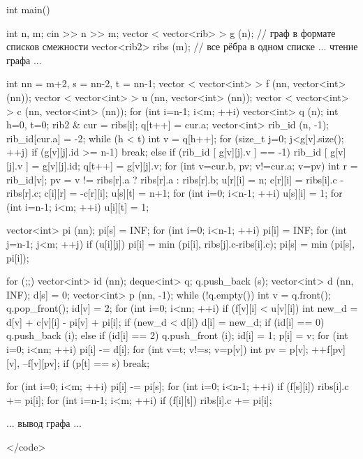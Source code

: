 int main() {

	int n, m;
	cin >> n >> m;
	vector < vector<rib> > g (n); // граф в формате списков смежности
	vector<rib2> ribs (m); // все рёбра в одном списке
	... чтение графа ...

	int nn = m+2,  s = nn-2,  t = nn-1;
	vector < vector<int> > f (nn, vector<int> (nn));
	vector < vector<int> > u (nn, vector<int> (nn));
	vector < vector<int> > c (nn, vector<int> (nn));
	for (int i=n-1; i<m; ++i) {
		vector<int> q (n);
		int h=0, t=0;
		rib2 & cur = ribs[i];
		q[t++] = cur.a;
		vector<int> rib_id (n, -1);
		rib_id[cur.a] = -2;
		while (h < t) {
			int v = q[h++];
			for (size_t j=0; j<g[v].size(); ++j)
				if (g[v][j].id >= n-1)
					break;
				else if (rib_id [ g[v][j].v ] == -1) {
					rib_id [ g[v][j].v ] = g[v][j].id;
					q[t++] = g[v][j].v;
				}
		}
		for (int v=cur.b, pv; v!=cur.a; v=pv) {
			int r = rib_id[v];
			pv = v != ribs[r].a ? ribs[r].a : ribs[r].b;
			u[r][i] = n;
			c[r][i] = ribs[i].c - ribs[r].c;
			c[i][r] = -c[r][i];
		}
	}
	u[s][t] = n+1;
	for (int i=0; i<n-1; ++i)
		u[s][i] = 1;
	for (int i=n-1; i<m; ++i)
		u[i][t] = 1;

	vector<int> pi (nn);
	pi[s] = INF;
	for (int i=0; i<n-1; ++i) {
		pi[i] = INF;
		for (int j=n-1; j<m; ++j)
			if (u[i][j])
				pi[i] = min (pi[i], ribs[j].c-ribs[i].c);
		pi[s] = min (pi[s], pi[i]);
	}

	for (;;) {
		vector<int> id (nn);
		deque<int> q;
		q.push_back (s);
		vector<int> d (nn, INF);
		d[s] = 0;
		vector<int> p (nn, -1);
		while (!q.empty()) {
			int v = q.front();  q.pop_front();
			id[v] = 2;
			for (int i=0; i<nn; ++i)
				if (f[v][i] < u[v][i]) {
					int new_d = d[v] + c[v][i] - pi[v] + pi[i];
					if (new_d < d[i]) {
						d[i] = new_d;
						if (id[i] == 0)
							q.push_back (i);
						else if (id[i] == 2)
							q.push_front (i);
						id[i] = 1;
						p[i] = v;
					}
				}
		}
		for (int i=0; i<nn; ++i)
			pi[i] -= d[i];
		for (int v=t; v!=s; v=p[v]) {
			int pv = p[v];
			++f[pv][v],  --f[v][pv];
		}
		if (p[t] == s)  break;
	}

	for (int i=0; i<m; ++i)
		pi[i] -= pi[s];
	for (int i=0; i<n-1; ++i)
		if (f[s][i])
			ribs[i].c += pi[i];
	for (int i=n-1; i<m; ++i)
		if (f[i][t])
			ribs[i].c += pi[i];

	... вывод графа ...
	
}</code>